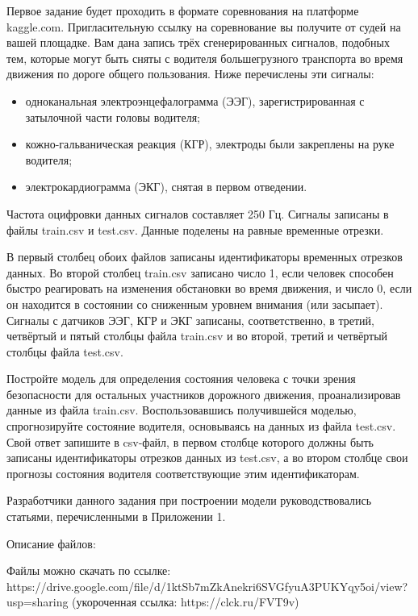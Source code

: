 
Первое задание будет проходить в формате соревнования на платформе kaggle.com. Пригласительную ссылку на соревнование вы получите от судей на вашей площадке.
Вам дана запись трёх сгенерированных сигналов, подобных тем, которые могут быть сняты с водителя большегрузного транспорта во время движения по дороге общего пользования. Ниже перечислены эти сигналы:

\begin{itemize}
    \item одноканальная электроэнцефалограмма (ЭЭГ), зарегистрированная с затылочной части головы водителя;
    \item кожно-гальваническая реакция (КГР), электроды были закреплены на руке водителя;
    \item электрокардиограмма (ЭКГ), снятая в первом отведении. 
\end{itemize}

Частота оцифровки данных сигналов составляет 250 Гц. Сигналы записаны в файлы train.csv и test.csv. Данные поделены на равные временные отрезки. 

В первый столбец обоих файлов записаны идентификаторы временных отрезков данных. Во второй столбец train.csv записано число 1, если человек способен быстро реагировать на изменения обстановки во время движения, и число 0, если он находится в состоянии со сниженным уровнем внимания (или засыпает). Сигналы с датчиков ЭЭГ, КГР и ЭКГ записаны, соответственно, в третий, четвёртый и пятый столбцы файла train.csv и во второй, третий и четвёртый столбцы файла test.csv.

Постройте модель для определения состояния человека с точки зрения безопасности для остальных участников дорожного движения, проанализировав данные из файла train.csv. Воспользовавшись получившейся моделью, спрогнозируйте состояние водителя, основываясь на данных из файла test.csv. Свой ответ запишите в csv-файл, в первом столбце которого должны быть записаны идентификаторы отрезков данных из test.csv, а во втором столбце свои прогнозы состояния водителя соответствующие этим идентификаторам.

Разработчики данного задания при построении модели руководствовались статьями, перечисленными в Приложении 1.

Описание файлов: 

Файлы можно скачать по ссылке: https://drive.google.com/file/d/1ktSb7mZkAnekri6SVGfyuA3PUKYqy5oi/view?usp=sharing  (укороченная ссылка: https://clck.ru/FVT9v)

